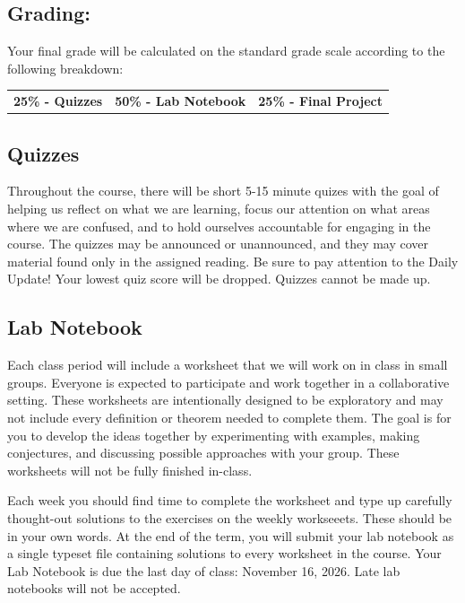 \documentclass[11pt,letterpaper]{article}
\begin{document}
\subsection*{Grading:}

Your final grade will be calculated on the standard grade scale according to the following breakdown:

\vspace{2pt}\begingroup\setlength{\fboxsep}{8pt}
\colorbox{Pale}{\begin{minipage}{\dimexpr\linewidth-16pt\relax}
\begin{tabularx}{\linewidth}{@{}XXX@{}}
{\sffamily\bfseries\color{Forest}25\% - Quizzes} & {\sffamily\bfseries\color{Forest}50\% - Lab Notebook} & {\sffamily\bfseries\color{Forest}25\% - Final Project}
\end{tabularx}\end{minipage}}\endgroup\vspace{3pt}

\subsection*{Quizzes}

Throughout the course, there will be short 5-15 minute quizes with the goal of helping us reflect on what we are learning, focus our attention on what areas where we are confused, and to hold ourselves accountable for engaging in the course. The quizzes may be announced or unannounced, and they may cover material found only in the assigned reading. Be sure to pay attention to the Daily Update! Your lowest quiz score will be dropped. Quizzes cannot be made up.

\subsection*{Lab Notebook}

Each class period will include a worksheet that we will work on in class in small groups. Everyone is expected to participate and work together in a collaborative setting. These worksheets are intentionally designed to be exploratory and may not include every definition or theorem needed to complete them. The goal is for you to develop the ideas together by experimenting with examples, making conjectures, and discussing possible approaches with your group. These worksheets will not be fully finished in-class.

Each week you should find time to complete the worksheet and type up carefully thought-out solutions to the exercises on the weekly workseeets. These should be in your own words. At the end of the term, you will submit your lab notebook as a single typeset file containing solutions to every worksheet in the course. Your Lab Notebook is due the last day of class: November 16, 2026. Late lab notebooks will not be accepted.
\end{document}
